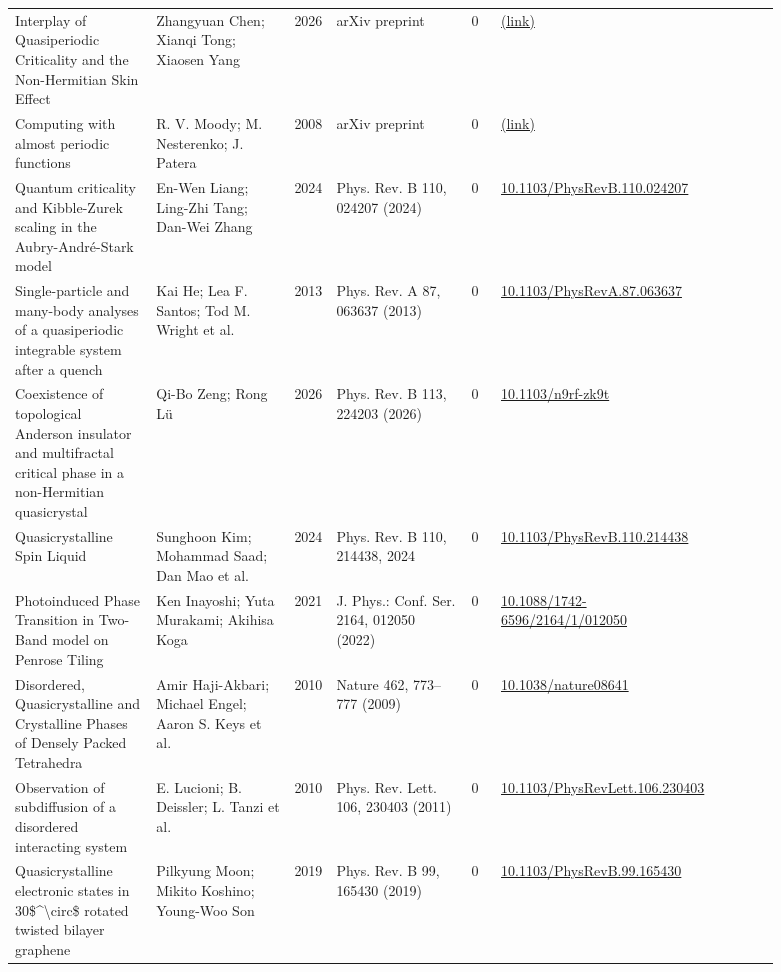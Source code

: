 \documentclass[10pt,a4paper]{article}
\begin{document}
{\begin{longtable}{p{0.192\linewidth}p{0.192\linewidth}p{0.043\linewidth}p{0.192\linewidth}p{0.043\linewidth}p{0.132\linewidth}p{0.096\linewidth}}
Interplay of Quasiperiodic Criticality and the Non-Hermitian Skin Effect & Zhangyuan Chen; Xianqi Tong; Xiaosen Yang & 2026 & arXiv preprint & 0 & \href{http://arxiv.org/abs/2607.08294v1}{(link)} &  \\
Computing with almost periodic functions & R. V. Moody; M. Nesterenko; J. Patera & 2008 & arXiv preprint & 0 & \href{http://arxiv.org/abs/0808.1814v1}{(link)} &  \\
Quantum criticality and Kibble-Zurek scaling in the Aubry-André-Stark model & En-Wen Liang; Ling-Zhi Tang; Dan-Wei Zhang & 2024 & Phys. Rev. B 110, 024207 (2024) & 0 & \href{https://doi.org/10.1103/PhysRevB.110.024207}{10.1103/PhysRevB.110.024207} &  \\
Single-particle and many-body analyses of a quasiperiodic integrable system after a quench & Kai He; Lea F. Santos; Tod M. Wright et al. & 2013 & Phys. Rev. A 87, 063637 (2013) & 0 & \href{https://doi.org/10.1103/PhysRevA.87.063637}{10.1103/PhysRevA.87.063637} &  \\
Coexistence of topological Anderson insulator and multifractal critical phase in a non-Hermitian quasicrystal & Qi-Bo Zeng; Rong Lü & 2026 & Phys. Rev. B 113, 224203 (2026) & 0 & \href{https://doi.org/10.1103/n9rf-zk9t}{10.1103/n9rf-zk9t} &  \\
Quasicrystalline Spin Liquid & Sunghoon Kim; Mohammad Saad; Dan Mao et al. & 2024 & Phys. Rev. B 110, 214438, 2024 & 0 & \href{https://doi.org/10.1103/PhysRevB.110.214438}{10.1103/PhysRevB.110.214438} &  \\
Photoinduced Phase Transition in Two-Band model on Penrose Tiling & Ken Inayoshi; Yuta Murakami; Akihisa Koga & 2021 & J. Phys.: Conf. Ser. 2164, 012050 (2022) & 0 & \href{https://doi.org/10.1088/1742-6596/2164/1/012050}{10.1088/1742-6596/2164/1/012050} &  \\
Disordered, Quasicrystalline and Crystalline Phases of Densely Packed Tetrahedra & Amir Haji-Akbari; Michael Engel; Aaron S. Keys et al. & 2010 & Nature 462, 773--777 (2009) & 0 & \href{https://doi.org/10.1038/nature08641}{10.1038/nature08641} &  \\
Observation of subdiffusion of a disordered interacting system & E. Lucioni; B. Deissler; L. Tanzi et al. & 2010 & Phys. Rev. Lett. 106, 230403 (2011) & 0 & \href{https://doi.org/10.1103/PhysRevLett.106.230403}{10.1103/PhysRevLett.106.230403} &  \\
Quasicrystalline electronic states in 30\$\^{}\textbackslash{}circ\$ rotated twisted bilayer graphene & Pilkyung Moon; Mikito Koshino; Young-Woo Son & 2019 & Phys. Rev. B 99, 165430 (2019) & 0 & \href{https://doi.org/10.1103/PhysRevB.99.165430}{10.1103/PhysRevB.99.165430} &  \\

\end{longtable}}
\end{document}
